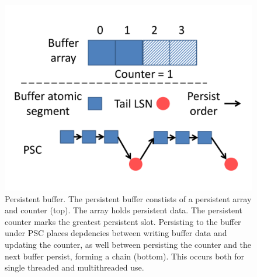\begin{figure}
\centering
\includegraphics[width=\textwidth]{PMC_patterns/buffer.pdf}
\caption{Persistent buffer. The persistent buffer constists of a persistent array and counter (top).  The array holds persistent data.  The persistent counter marks the greatest persistent slot.  Persisting to the buffer under PSC places depdencies between writing buffer data and updating the counter, as well between persisting the counter and the next buffer persist, forming a chain (bottom).  This occurs both for single threaded and multithreaded use.}
\label{fig:buffer}
\end{figure}
